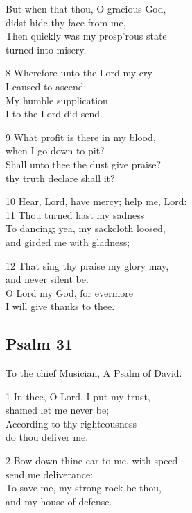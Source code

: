 \begin{multicols}{3}
But when that thou, O gracious God,\\
didst hide thy face from me,\\
Then quickly was my prosp’rous state\\
turned into misery.

8 Wherefore unto the Lord my cry\\
I caused to ascend:\\
My humble supplication\\
I to the Lord did send.

9 What profit is there in my blood,\\
when I go down to pit?\\
Shall unto thee the dust give praise?\\
thy truth declare shall it?

10 Hear, Lord, have mercy; help me, Lord:\\
11 Thou turned hast my sadness\\
To dancing; yea, my sackcloth loosed,\\
and girded me with gladness;

12 That sing thy praise my glory may,\\
and never silent be.\\
O Lord my God, for evermore\\
I will give thanks to thee.

\begin{center}
\quad{}\quad{}
\end{center}

\subsection*{Psalm 31 }

To the chief Musician, A Psalm of David.

1 In thee, O Lord, I put my trust,\\
shamed let me never be;\\
According to thy righteousness\\
do thou deliver me.

2 Bow down thine ear to me, with speed\\
send me deliverance:\\
To save me, my strong rock be thou,\\
and my house of defense.


\end{multicols}
